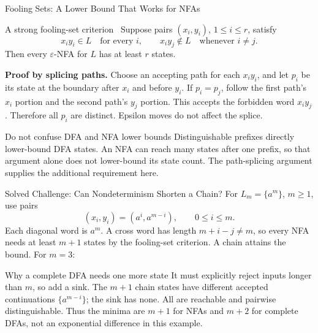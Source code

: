 \documentclass[10pt]{beamer}
\begin{document}
\begin{frame}{Fooling Sets: A Lower Bound That Works for NFAs}
  \small
  \begin{block}{A strong fooling-set criterion~\cite{glaister-shallit}}
    Suppose pairs $(x_i,y_i)$, $1\le i\le r$, satisfy
    \[
      x_i y_i\in L\quad\text{for every }i,\qquad
      x_i y_j\notin L\quad\text{whenever }i\ne j.
    \]
    Then every $\varepsilon$-NFA for $L$ has at least $r$ states.
  \end{block}
  \pause
  \textbf{Proof by splicing paths.} Choose an accepting path for each $x_i y_i$,
  and let $p_i$ be its state at the boundary after $x_i$ and before $y_i$.
  If $p_i=p_j$, follow the first path's $x_i$ portion and the second path's
  $y_j$ portion. This accepts the forbidden word $x_i y_j$.
  Therefore all $p_i$ are distinct. Epsilon moves do not affect the splice.
  \pause
  \begin{alertblock}{Do not confuse DFA and NFA lower bounds}
    Distinguishable prefixes directly lower-bound DFA states. An NFA can
    reach many states after one prefix, so that argument alone does not
    lower-bound its state count. The path-splicing argument supplies the
    additional requirement here.
  \end{alertblock}
\end{frame}

\begin{frame}{Solved Challenge: Can Nondeterminism Shorten a Chain?}
  \small
  For $L_m=\{a^m\}$, $m\ge1$, use pairs
  \[
    (x_i,y_i)=(a^i,a^{m-i}),\qquad 0\le i\le m.
  \]
  Each diagonal word is $a^m$. A cross word has length $m+i-j\ne m$,
  so every NFA needs at least $m+1$ states by the fooling-set criterion.
  \pause
  A chain attains the bound. For $m=3$:
  \begin{center}
  \end{center}
  \pause
  \begin{block}{Why a complete DFA needs one more state}
    It must explicitly reject inputs longer than $m$, so add a sink.
    The $m+1$ chain states have different accepted continuations
    $\{a^{m-i}\}$; the sink has none. All are reachable and pairwise
    distinguishable. Thus the minima are $m+1$ for NFAs and $m+2$ for
    complete DFAs, not an exponential difference in this example.
  \end{block}
\end{frame}
\end{document}
